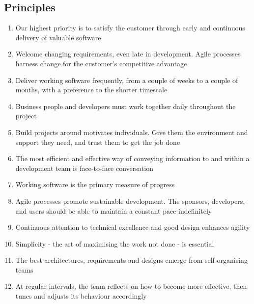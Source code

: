 \documentclass{article}[18pt]
\begin{document}
\subsection{Principles}
\begin{enumerate}
	\item Our highest priority is to satisfy the customer through early and continuous delivery of valuable software
	\item Welcome changing requirements, even late in development. Agile processes harness change for the customer's competitive advantage
	\item Deliver working software frequently, from a couple of weeks to a couple of months, with a preference to the shorter timescale
	\item Business people and developers must work together daily throughout the project
	\item Build projects around motivates individuals. Give them the environment and support they need, and trust them to get the job done
	\item The most efficient and effective way of conveying information to and within a development team is face-to-face conversation
	\item Working software is the primary measure of progress
	\item Agile processes promote sustainable development. The sponsors, developers, and users should be able to maintain a constant pace indefinitely
	\item Continuous attention to technical excellence and good design enhances agility
	\item Simplicity - the art of maximising the work not done - is essential
	\item The best architectures, requirements and designs emerge from self-organising teams
	\item At regular intervals, the team reflects on how to become more effective, then tunes and adjusts its behaviour accordingly
\end{enumerate}
\end{document}
